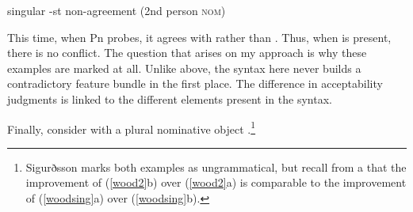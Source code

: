 \documentclass[output=paper]{langscibook}
\begin{document}
\ea \datnom{} singular -st non-agreement (2nd person \textsc{nom})\smallskip\\
\z

This time, when Pn probes, it agrees with \sti rather than . Thus, when \sti is present, there is no conflict. The question that arises on my approach is why these examples are marked at all. Unlike above, the syntax here never builds a contradictory feature bundle in the first place. The difference in acceptability judgments is linked to the different elements present in the syntax.


Finally, consider  \sti with a plural nominative object \citep[33]{SigurTHsson:1996va}.\footnote{Sigurðsson marks both examples as ungrammatical, but recall from a that the improvement of (\ref{wood2}b) over (\ref{wood2}a) is comparable to the improvement of (\ref{woodsing}a) over (\ref{woodsing}b).}


\ea {}\label{wood2} 

    \z
\z
\end{document}
